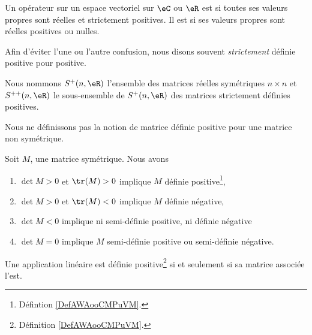 \begin{definition}    \label{DefAWAooCMPuVM}
    Un opérateur sur un espace vectoriel sur \( \eC\) ou \( \eR\) est  si toutes ses valeurs propres sont réelles et strictement positives.  Il est  si ses valeurs propres sont réelles positives ou nulles.
\end{definition}
Afin d'éviter l'une ou l'autre confusion, nous disons souvent \emph{strictement} définie positive pour positive.

\begin{normaltext}      \label{NORMooAJLHooQhwpvr}
    Nous nommons \( S^+(n,\eR)\) l'ensemble des matrices réelles symétriques \( n\times n\) et \( S^{++}(n,\eR)\) le sous-ensemble de \( S^+(n,\eR)\) des matrices strictement définies positives.
\end{normaltext}

\begin{remark}
    Nous ne définissons pas la notion de matrice définie positive pour une matrice non symétrique.
\end{remark}

\begin{proposition}     \label{PropcnJyXZ}
    Soit $M$, une matrice symétrique. Nous avons
    \begin{enumerate}
        \item
            $\det M>0$ et $\tr(M)>0$ implique $M$ définie positive\footnote{Défintion \ref{DefAWAooCMPuVM}.},
        \item
        $\det M>0$ et $\tr(M)<0$ implique $M$ définie négative,
    \item   \label{ItemluuFPN}
        $\det M<0$ implique ni semi-définie positive, ni définie négative 
        \item
        $\det M=0$ implique $M$ semi-définie positive ou semi-définie négative.
    \end{enumerate}
\end{proposition}

\begin{proposition}     \label{PROPooUAAFooEGVDRC}
    Une application linéaire est définie positive\footnote{Définition \ref{DefAWAooCMPuVM}.} si et seulement si sa matrice associée l'est.
\end{proposition}

